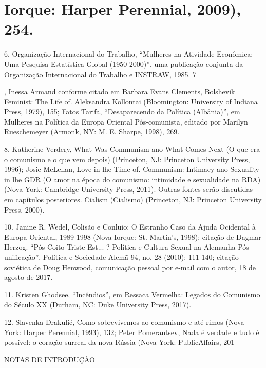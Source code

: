 \section{Iorque: Harper Perennial, 2009), 254.}
 \par 
6. Organização Internacional do Trabalho, “Mulheres na Atividade Econômica: Uma Pesquisa Estatística Global (1950-2000)”, uma publicação conjunta da Organização Internacional do Trabalho e INSTRAW, 1985. {\color{blue} 7 } {\par} , Inessa Armand conforme citado em Barbara Evans Clements, Bolshevik Feminist: The Life of. Aleksandra Kollontai (Bloomington: University of Indiana Press, 1979), 155; Fatos Tarifa, “Desaparecendo da Política (Albânia)”, em Mulheres na Política da Europa Oriental Pós-comunista, editado por Marilyn Rueschemeyer (Armonk, NY: M. E. Sharpe, 1998), {\color{blue}269}.
 \par 
8. Katherine Verdery, What Was Communism ano What Comes Next (O que era o comunismo e o que vem depois) (Princeton, NJ: Princeton University Press, 1996); Josie McLellan, Love in lhe Time of. Communism: Intimacy ano Sexuality in lhe GDR (O amor na época do comunismo: intimidade e sexualidade na RDA) (Nova York: Cambridge University Press, 2011). Outras fontes serão discutidas em capítulos posteriores. Cialism (Cialismo) (Princeton, NJ: Princeton University Press, 2000).
 \par 
10. Janine R. Wedel, Colisão e Conluio: O Estranho Caso da Ajuda Ocidental à Europa Oriental, 1989-1998 (Nova Iorque: St. Martin's, 1998); citação de Dagmar Herzog. “Pós-Coito Triste Est... ? Política e Cultura Sexual na Alemanha Pós-unificação”, Política e Sociedade Alemã 94, no. {\color{blue}28} (2010): 111-140; citação soviética de Doug Henwood, comunicação pessoal por e-mail com o autor, {\color{blue}18} de agosto de 2017.
 \par 
11. Kristen Ghodsee, “Incêndios”, em Ressaca Vermelha: Legados do Comunismo do Século XX (Durham, NC: Duke University Press, 2017).
 \par 
12. Slavenka Drakulić, Como sobrevivemos ao comunismo e até rimos (Nova York: Harper Perennial, 1993), 132; Peter Pomerantsev, Nada é verdade e tudo é possível: o coração surreal da nova Rússia (Nova York: PublicAffairs, 201%
 \par 
NOTAS DE INTRODUÇÃO
 \par 

